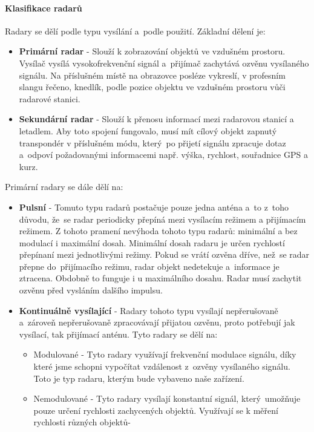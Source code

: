 	\paragraph{Klasifikace radarů}
			Radary se dělí podle typu vysílání a~podle použití\cite{radarClasification}. Základní dělení je: 
			\begin{itemize}
				\item \textbf{Primární radar}	-	Slouží k zobrazování objektů ve vzdušném prostoru. Vysílač vysílá vysokofrekvenční signál a~přijímač zachytává ozvěnu vysílaného signálu. Na příslušném místě na obrazovce posléze vykreslí, v profesním slangu řečeno, knedlík, podle pozice objektu ve vzdušném prostoru vůči radarové stanici.
					
				\item \textbf{Sekundární radar}	-	Slouží k přenosu informací mezi radarovou stanicí a letadlem. Aby toto spojení fungovalo, musí mít cílový objekt zapnutý transpondér v příslušném módu, který~po přijetí signálu zpracuje dotaz a~odpoví požadovanými informacemi např. výška, rychlost, souřadnice GPS a kurz. 
			\end{itemize}
			
			Primární radary se dále dělí na:
			\begin{itemize}
				\item \textbf{Pulsní}	-	Tomuto typu radarů postačuje pouze jedna anténa a~to z~toho důvodu, že~se radar periodicky přepíná mezi vysílacím režimem a přijímacím režimem. Z tohoto pramení nevýhoda tohoto typu radarů: minimální a bez modulací i maximální dosah. Minimální dosah radaru je určen rychlostí přepínaní mezi jednotlivými režimy. Pokud se vrátí ozvěna dříve, než~se radar přepne do~přijímacího režimu, radar objekt nedetekuje a~informace je ztracena. Obdobně to funguje i u maximálního dosahu. Radar musí zachytit ozvěnu před vysláním dalšího impulsu.
				
				\item \textbf{Kontinuálně vysílající}	-	Radary tohoto typu vysílají nepřerušovaně a~zároveň nepřerušovaně zpracovávají přijatou ozvěnu, proto potřebují jak vysílací, tak přijímací anténu. Tyto radary se dělí na:
					\begin{itemize}
						\item Modulované - Tyto radary využívají frekvenční modulace signálu, díky které jsme schopni vypočítat vzdálenost z~ozvěny vysílaného signálu. Toto je typ radaru, kterým bude vybaveno naše zařízení.
						
						\item Nemodulované - Tyto radary vysílají konstantní signál, který~umožňuje pouze určení rychlosti zachycených objektů. Využívají se k měření rychlosti různých objektů-
					\end{itemize}
			\end{itemize}
		
